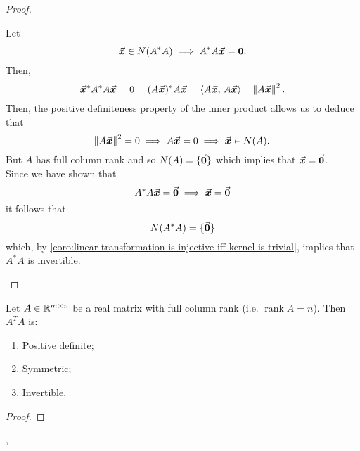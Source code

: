 \documentclass[../MathsNotesBase.tex]{subfiles}
\begin{document}
{\begin{proof}
\begin{enumerate}[label=(\roman*)]
{						
						Let 
						\[ \vec{\bm{x}} \in N(A^* A) \implies A^* A \vec{\bm{x}} = \vec{\bm{0}}. \]
						Then,
						\[ \vec{\bm{x}}^* A^* A \vec{\bm{x}} = 0 = (A\vec{\bm{x}})^* A\vec{\bm{x}} = \langle A\vec{\bm{x}},\, A\vec{\bm{x}} \rangle = \norm{A\vec{\bm{x}}}^2. \]
						Then, the positive definiteness property of the inner product allows us to deduce that
						\[ \norm{A\vec{\bm{x}}}^2 = 0 \implies A\vec{\bm{x}} = 0 \implies \vec{\bm{x}} \in N(A). \]
						But $A$ has full column rank and so ${ N(A) = \{\vec{\bm{0}}\} }$ which implies that ${ \vec{\bm{x}} = \vec{\bm{0}} }$.\\
						
						Since we have shown that
						\[ A^* A \vec{\bm{x}} = \vec{\bm{0}} \implies \vec{\bm{x}} = \vec{\bm{0}} \]
						it follows that
						\[ N(A^* A) = \{\vec{\bm{0}}\} \]
						which, by \autoref{coro:linear-transformation-is-injective-iff-kernel-is-trivial}, implies that ${ A^* A }$ is invertible.
					}
				\end{enumerate}
			\end{proof}
			\begin{corollary}\label{coro:properties-of-real-full-column-rank-matrix-product-with-transpose}
				Let ${ A \in \mathbb{R}^{m \times n} }$ be a real matrix with full column rank (i.e. ${ \operatorname{rank} A = n }$). Then ${ A^T A }$ is:
				\begin{enumerate}[label=(\roman*)]
					\item{Positive definite;}
					\item{Symmetric;}
					\item{Invertible.}
				\end{enumerate}
			\end{corollary}
			\begin{proof}
			\end{proof}
			
			
			\sep
			\begin{exe}
				\label{ex:principal-minors-check-indeterminate-case}
			\end{exe}
		}
	
\end{document}
